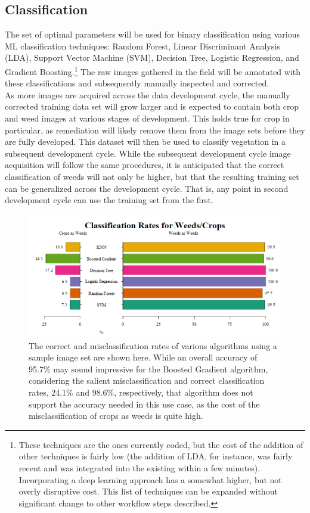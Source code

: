\documentclass[12pt]{article}
\begin{document}
\subsection{Classification}
The set of optimal parameters will be used for binary classification using various ML classification techniques: Random Forest, Linear Discriminant Analysis (LDA), Support Vector Machine (SVM), Decision Tree, Logistic Regression, and Gradient Boosting.\footnote{These techniques are the ones currently coded, but the cost of the addition of other techniques is fairly low (the addition of LDA, for instance, was fairly recent and was integrated into the existing within a few minutes). Incorporating a deep learning approach has a somewhat higher, but not overly disruptive cost. This list of techniques can be expanded without significant change to other workflow steps described.} The raw images gathered in the field will be annotated with these classifications and subsequently manually inspected and corrected.\\
As more images are acquired across the data development cycle, the manually corrected training data set will grow larger and is expected to contain both crop and weed images at various stages of development. This holds true for crop in particular, as remediation will likely remove them from the image sets before they are fully developed. This dataset will then be used to classify vegetation in a subsequent development cycle. While the subsequent development cycle image acquisition will follow the same procedures, it is anticipated that the correct classification of weeds will not only be higher, but that the resulting training set can be generalized across the development cycle. That is, any point in second development cycle can use the training set from the first.
\begin{figure}[h]
	\centering
	\includegraphics[width=0.7\linewidth]{./figures/classification-rates.png}
	\caption[Misclassification rates of various algorithms for sample images]{The correct and misclassification rates of various algorithms using a sample image set are shown here. While an overall accuracy of 95.7\% may sound impressive for the Boosted Gradient algorithm, considering the salient misclassification and correct classification rates, 24.1\% and 98.6\%, respectively, that algorithm does not support the accuracy needed in this use case, as the cost of the misclassification of crops as weeds is quite high.}
	\label{fig:classification-rates}
\end{figure}
\end{document}
